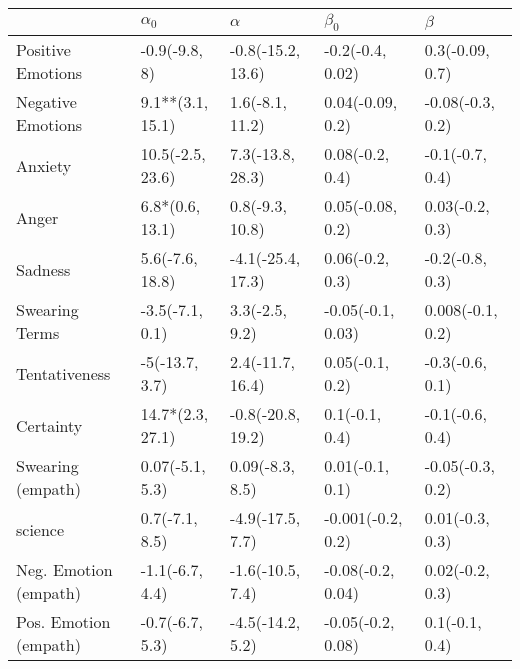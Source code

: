 \begin{tabular}{lllll}
\toprule
{} &        $\alpha_0$ &           $\alpha$ &          $\beta_0$ &           $\beta$ \\
\midrule
Positive Emotions     &     -0.9(-9.8, 8) &  -0.8(-15.2, 13.6) &   -0.2(-0.4, 0.02) &   0.3(-0.09, 0.7) \\
Negative Emotions     &  9.1**(3.1, 15.1) &    1.6(-8.1, 11.2) &   0.04(-0.09, 0.2) &  -0.08(-0.3, 0.2) \\
Anxiety               &  10.5(-2.5, 23.6) &   7.3(-13.8, 28.3) &    0.08(-0.2, 0.4) &   -0.1(-0.7, 0.4) \\
Anger                 &   6.8*(0.6, 13.1) &    0.8(-9.3, 10.8) &   0.05(-0.08, 0.2) &   0.03(-0.2, 0.3) \\
Sadness               &   5.6(-7.6, 18.8) &  -4.1(-25.4, 17.3) &    0.06(-0.2, 0.3) &   -0.2(-0.8, 0.3) \\
Swearing Terms        &   -3.5(-7.1, 0.1) &     3.3(-2.5, 9.2) &  -0.05(-0.1, 0.03) &  0.008(-0.1, 0.2) \\
Tentativeness         &    -5(-13.7, 3.7) &   2.4(-11.7, 16.4) &    0.05(-0.1, 0.2) &   -0.3(-0.6, 0.1) \\
Certainty             &  14.7*(2.3, 27.1) &  -0.8(-20.8, 19.2) &     0.1(-0.1, 0.4) &   -0.1(-0.6, 0.4) \\
Swearing (empath)     &   0.07(-5.1, 5.3) &    0.09(-8.3, 8.5) &    0.01(-0.1, 0.1) &  -0.05(-0.3, 0.2) \\
science               &    0.7(-7.1, 8.5) &   -4.9(-17.5, 7.7) &  -0.001(-0.2, 0.2) &   0.01(-0.3, 0.3) \\
Neg. Emotion (empath) &   -1.1(-6.7, 4.4) &   -1.6(-10.5, 7.4) &  -0.08(-0.2, 0.04) &   0.02(-0.2, 0.3) \\
Pos. Emotion (empath) &   -0.7(-6.7, 5.3) &   -4.5(-14.2, 5.2) &  -0.05(-0.2, 0.08) &    0.1(-0.1, 0.4) \\
\bottomrule
\end{tabular}
